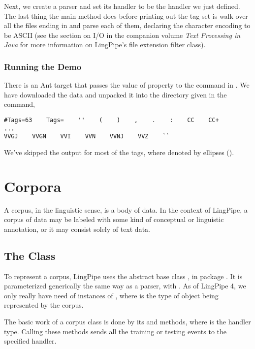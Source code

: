 Next, we create a parser and set its handler to be the
handler we just defined.
%
%
The last thing the main method does before printing out the tag set is
walk over all the files ending in  and parse each of them,
declaring the character encoding to be ASCII (see the section on I/O
in the companion volume {\it Text Processing in Java} for more
information on LingPipe's file extension filter class).

\subsubsection{Running the Demo}

There is an Ant target  that passes
the value of property  to the command
in .  We have downloaded the data
and unpacked it into the directory given in the command,
%
\begin{verbatim}
#Tags=63    Tags=    ''    (    )    ,    .    :    CC    CC+
... 
VVGJ    VVGN    VVI    VVN    VVNJ    VVZ    ``
\end{verbatim}
%
We've skipped the output for most of the tags, where denoted by
ellipses ().


\section{Corpora}

A corpus, in the linguistic sense, is a body of data.  In the context
of LingPipe, a corpus of data may be labeled with some kind of
conceptual or linguistic annotation, or it may consist solely of text
data.

\subsection{The  Class}

To represent a corpus, LingPipe uses the abstract base class
, in package .  It is
parameterized generically the same way as a parser, with
.  As of LingPipe 4, we only really
have need of instances of , where
 is the type of object being represented by the corpus.

The basic work of a corpus class is done by its 
and  methods, where  is the handler type.
Calling these methods sends all the training or testing events to the
specified handler.  

